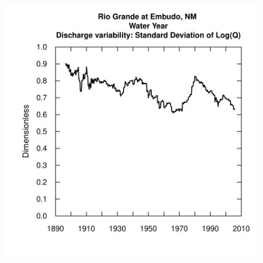 \documentclass[a4paper,11pt]{article}
\begin{document}
\begin{figure}[htbp]
\begin{minipage}[h]{0.5\linewidth}
\begin{center}
\includegraphics{EGRET-figplotSDLogQ}
    \label{fig:plotSDLogQ}
    \end{center}
  \end{minipage}
  \caption{}
  \label{fig:plotFlowSingleANDplotSDLogQ}
\end{figure}
\end{document}
